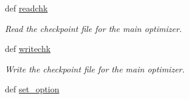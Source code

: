 \begin{DoxyCompactItemize}
def \hyperlink{classforcebalance_1_1optimizer_1_1Optimizer_a05ee5fe985b3e2ec71071ca061e42d66}{readchk}
\begin{DoxyCompactList}\small\item\em Read the checkpoint file for the main optimizer. \end{DoxyCompactList}\item 
def \hyperlink{classforcebalance_1_1optimizer_1_1Optimizer_aa7ac7cda43b70ac58ccbd6c8445e88ef}{writechk}
\begin{DoxyCompactList}\small\item\em Write the checkpoint file for the main optimizer. \end{DoxyCompactList}\item 
def \hyperlink{classforcebalance_1_1BaseClass_a73e9a37a7632e79eb99f49bd15aced45}{set\-\_\-option}
\end{DoxyCompactItemize}
